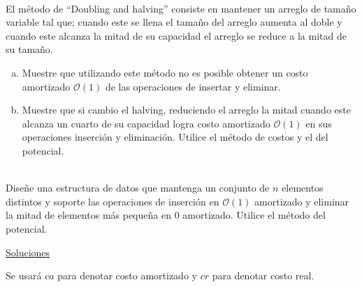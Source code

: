 \documentclass[dcc,uchile]{fcfmcourse}
\begin{document}
\begin{problems}
\\
El método de ``Doubling and halving'' consiste en mantener un arreglo de tamaño variable tal que; cuando este se llena el tamaño del arreglo aumenta al doble y cuando este alcanza la mitad de su capacidad el arreglo se reduce a la mitad de su tamaño.
\begin{enumerate}[a)]
    \item Muestre que utilizando este método no es posible obtener un costo amortizado $\mathcal{O}(1)$ de las operaciones de insertar y eliminar.
    \item Muestre que si cambio el halving, reduciendo el arreglo la mitad cuando este alcanza un cuarto de su capacidad logra costo amortizado $\mathcal{O}(1)$ en sus operaciones inserción y eliminación.  Utilice el método de costos y el del potencial.
\end{enumerate}
\\
Diseñe una estructura de datos que mantenga un conjunto de $n$ elementos distintos y soporte las operaciones de inserción en $\mathcal{O}(1)$ amortizado y eliminar la mitad de elementos más pequeña en $0$ amortizado. Utilice el método del potencial.
\end{problems}
\newpage
\begin{center}
{\huge \underline{Soluciones}}
\end{center}
Se usará $ca$ para denotar costo amortizado y $cr$ para denotar costo real.
\end{document}
